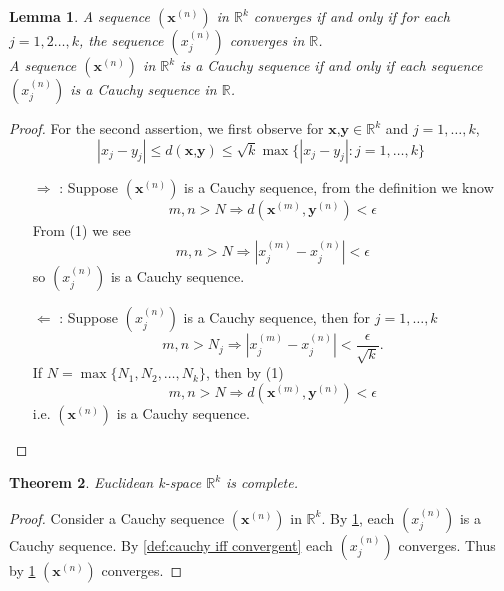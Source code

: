 \documentclass[12pt, lettersize]{book}
\newtheorem{thm}{Theorem}[section]
\newtheorem{lem}[thm]{Lemma}
\begin{document}
		\setcounter{equation}{0}
		\begin{lem}\label{def:sequence in R^k}
		A sequence $(\textbf{x}^{(n)})$ in $\mathbb{R}^k$ converges if and only if for each $j=1,2\dots,k$, the sequence
		$(x_j^{(n)})$ converges in $\mathbb{R}$.\\
		A sequence $(\textbf{x}^{(n)})$ in $\mathbb{R}^k$ is a Cauchy sequence if and only if each sequence $(x_j^{(n)})$
		is a Cauchy sequence in $\mathbb{R}$.
		\end{lem}
		\begin{proof}
		For the second assertion, we first observe for $\textbf{x,y}\in\mathbb{R}^k$ and $j=1,\dots,k$,
		\begin{equation}
			|x_j-y_j|\leq d(\textbf{x,y})\leq \sqrt{k}\max\{|x_j-y_j|: j=1,\dots,k\}
		\end{equation}
		\begin{itemize}
			\item[$\Rightarrow$]: Suppose $(\textbf{x}^{(n)})$ is a Cauchy sequence, from the definition we know
			\begin{displaymath}
				m,n>N\Rightarrow d(\textbf{x}^{(m)},\textbf{y}^{(n)})<\epsilon
			\end{displaymath}
			From (1) we see
			\begin{displaymath}
				m,n>N\Rightarrow|x_j^{(m)}-x_j^{(n)}|<\epsilon
			\end{displaymath}
			so $(x_j^{(n)})$ is a Cauchy sequence.
			\item[$\Leftarrow$]:  Suppose $(x_j^{(n)})$ is a Cauchy sequence, then for $j=1,\dots,k$
			\begin{displaymath}
				m,n>N_j\Rightarrow|x_j^{(m)}-x_j^{(n)}|<\frac{\epsilon}{\sqrt{k}}.
			\end{displaymath}
			If $N=\max\{N_1,N_2,\dots,N_k\}$, then by (1)
			\begin{displaymath}
				m,n>N\Rightarrow d(\textbf{x}^{(m)},\textbf{y}^{(n)})<\epsilon
			\end{displaymath}
			i.e. $(\textbf{x}^{(n)})$ is a Cauchy sequence.
		\end{itemize}
		\end{proof}
		
		\begin{thm}
		Euclidean k-space $\mathbb{R}^k$ is complete.
		\end{thm}
		\begin{proof}
		Consider a Cauchy sequence $(\textbf{x}^{(n)})$ in $\mathbb{R}^k$. By \ref{def:sequence in R^k}, each $(x_j^{(n)})$ is a Cauchy sequence. By \ref{def:cauchy iff convergent} each $(x_j^{(n)})$ converges. Thus by \ref{def:sequence in R^k} $(\textbf{x}^{(n)})$ converges.
		\end{proof}
	
\end{document}

